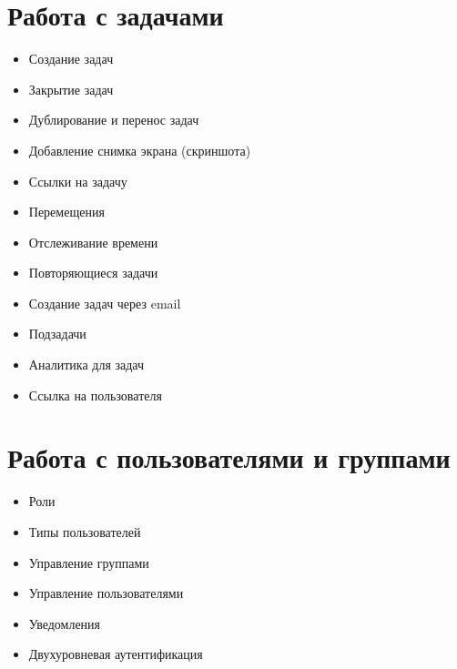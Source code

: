 \documentclass[letterpaper,10pt,russian]{sphinxmanual}
\begin{document}
\section{Работа с задачами}
\label{index:working-with-tasks}\begin{itemize}
\item {} 
Создание задач

\item {} 
Закрытие задач

\item {} 
Дублирование и перенос задач

\item {} 
Добавление снимка экрана (скриншота)

\item {} 
Ссылки на задачу

\item {} 
Перемещения

\item {} 
Отслеживание времени

\item {} 
Повторяющиеся задачи

\item {} 
Создание задач через email

\item {} 
Подзадачи

\item {} 
Аналитика для задач

\item {} 
Ссылка на пользователя

\end{itemize}


\section{Работа с пользователями и группами}
\label{index:working-with-users-and-groups}\begin{itemize}
\item {} 
Роли

\item {} 
Типы пользователей

\item {} 
Управление группами

\item {} 
Управление пользователями

\item {} 
Уведомления

\item {} 
Двухуровневая аутентификация

\end{itemize}
\end{document}
